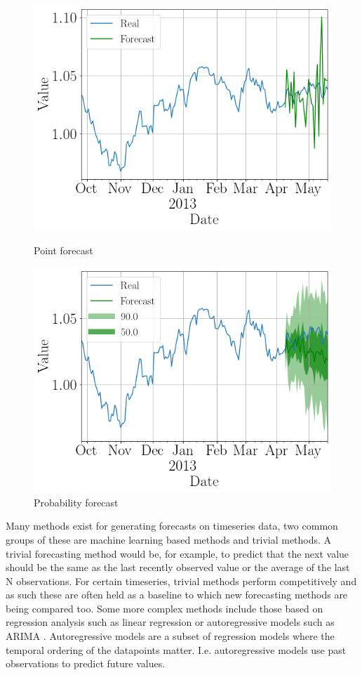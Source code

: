 \begin{figure}[htb]
    \centering
    \includegraphics[width=\linewidth]{./img/exchange_rate_point_forcast.png}
    \caption{Point forecast}
    \label{fig:example_timeseries_forecast_point}
    \endminipage\hfill
    \includegraphics[width=\linewidth]{./img/exchange_rate_prob_forcast.png}
    \caption{Probability forecast}
    \label{fig:example_timeseries_forecast_probabilistic}
    \endminipage\hfill
\end{figure}

Many methods exist for generating forecasts on timeseries data, two common groups of these are machine learning based methods and trivial methods. A trivial forecasting method would be, for example, to predict that the next value should be the same as the last recently observed value or the average of the last N observations. For certain timeseries, trivial methods perform competitively and as such these are often held as a baseline to which new forecasting methods are being compared too. Some more complex methods include those based on regression analysis such as linear regression or autoregressive models such as ARIMA \cite{hyndman_forecasting_3rd}. Autoregressive models are a subset of regression models where the temporal ordering of the datapoints matter. I.e. autoregressive models use past observations to predict future values.

